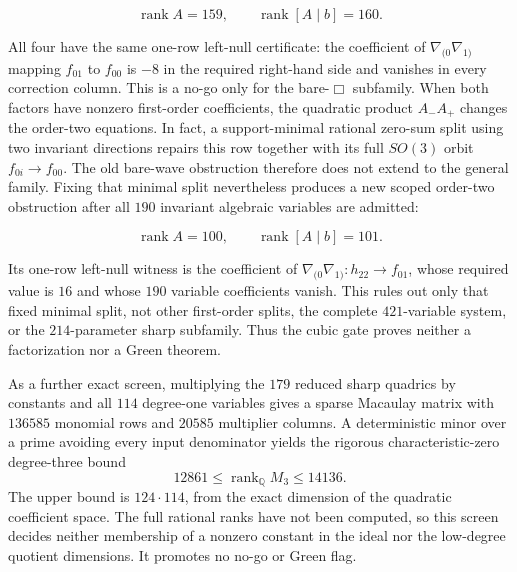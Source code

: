 \documentclass[11pt]{article}
\theoremstyle{definition}
\theoremstyle{remark}
\newcommand{\rank}{\operatorname{rank}}
\begin{document}
\begin{equation}\label{eq:bare-box-factor-obstruction}
 \rank A=159,
 \qquad
 \rank[A\mid b]=160.
\end{equation}

All four have the same one-row left-null certificate: the coefficient of
$\nabla_{(0}\nabla_{1)}$ mapping $f_{01}$ to $f_{00}$ is $-8$ in the
required right-hand side and vanishes in every correction column.  This is
a no-go only for the bare-$\Box$ subfamily.  When both factors have nonzero
first-order coefficients, the quadratic product $A_-A_+$ changes the
order-two equations.  In fact, a support-minimal rational zero-sum split
using two invariant directions repairs this row together with its full
$SO(3)$ orbit $f_{0i}\to f_{00}$.  The old bare-wave obstruction therefore
does not extend to the general family.  Fixing that minimal split nevertheless
produces a new scoped order-two obstruction after all $190$ invariant
algebraic variables are admitted:

\begin{equation}\label{eq:fixed-minimal-split-rank-no-go}
 \rank A=100,
 \qquad
 \rank[A\mid b]=101.
\end{equation}

Its one-row left-null witness is the coefficient of
$\nabla_{(0}\nabla_{1)}:h_{22}\to f_{01}$, whose required value is $16$ and
whose $190$ variable coefficients vanish.  This rules out only that fixed
minimal split, not other first-order splits, the complete $421$-variable
system, or the $214$-parameter sharp subfamily.
Thus the cubic gate proves neither a factorization nor a Green theorem.

As a further exact screen, multiplying the $179$ reduced sharp quadrics by
constants and all $114$ degree-one variables gives a sparse Macaulay matrix
with $136585$ monomial rows and $20585$ multiplier columns.  A deterministic
minor over a prime avoiding every input denominator yields the rigorous
characteristic-zero degree-three bound
\begin{equation}\label{eq:sharp-macaulay-rank-bounds}
 12861\leq \rank_{\mathbb Q} M_3\leq14136.
\end{equation}
The upper bound is $124\cdot114$, from the exact dimension of the quadratic
coefficient space.  The full rational ranks have not been computed, so this
screen decides neither membership of a nonzero constant in the ideal nor the
low-degree quotient dimensions.  It promotes no no-go or Green flag.
\end{document}
